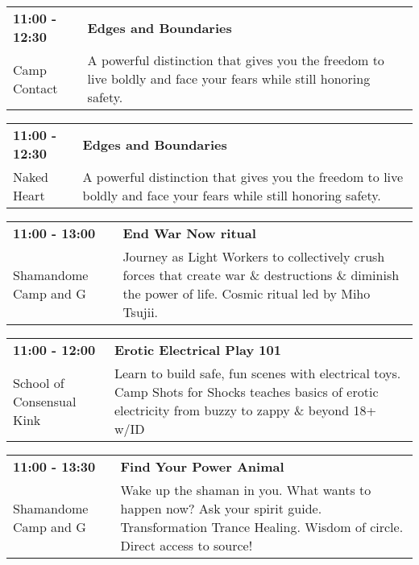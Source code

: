 \begin{tabular}{ p{1in} p{2.2in} }
    \textbf{11:00 - 12:30} & \textbf{Edges and Boundaries} \\
    Camp Contact \newline  & A powerful distinction that gives you the freedom to live boldly and face your fears while still honoring safety. \\
    \hline 
\end{tabular}
    
\begin{tabular}{ p{1in} p{2.2in} }
    \textbf{11:00 - 12:30} & \textbf{Edges and Boundaries} \\
    Naked Heart \newline  & A powerful distinction that gives you the freedom to live boldly and face your fears while still honoring safety. \\
    \hline 
\end{tabular}
    
\begin{tabular}{ p{1in} p{2.2in} }
    \textbf{11:00 - 13:00} & \textbf{End War Now ritual} \\
    Shamandome Camp \newline 615 and G & Journey as Light Workers to collectively crush forces that create war \& destructions \& diminish the power of life. Cosmic ritual led by Miho Tsujii. \\
    \hline 
\end{tabular}
    
\begin{tabular}{ p{1in} p{2.2in} }
    \textbf{11:00 - 12:00} & \textbf{Erotic Electrical Play 101} \\
    School of Consensual Kink \newline  & Learn to build safe, fun scenes with electrical toys. Camp Shots for Shocks teaches basics of erotic electricity from buzzy to zappy \& beyond 18+ w/ID \\
    \hline 
\end{tabular}
    
\begin{tabular}{ p{1in} p{2.2in} }
    \textbf{11:00 - 13:30} & \textbf{Find Your Power Animal} \\
    Shamandome Camp \newline 615 and G & Wake up the shaman in you. What wants to happen now? Ask your spirit guide. Transformation Trance Healing. Wisdom of circle. Direct access to source! \\
    \hline 
\end{tabular}
    
